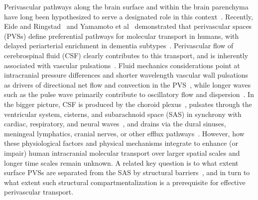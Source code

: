 \documentclass[fleqn,10pt]{wlscirep}
\begin{document}
Perivascular pathways along the brain surface and within the brain
parenchyma have long been hypothesized to serve a designated role in
this context~\cite{rennels1985evidence, zhang1990interrelationships,
  ichimura1991distribution, carare2008solutes, iliff2012paravascular,
  foley2012realtime, hannocks2018molecular, van2024caa}. Recently, Eide and
Ringstad~\cite{eide2024functional} and Yamamoto et
al~\cite{yamamoto2024perivascular} demonstrated that perivascular
spaces (PVSs) define preferential pathways for molecular transport in
humans, with delayed periarterial enrichment in dementia
subtypes~\cite{eide2024functional}. Perivascular flow of cerebrospinal
fluid (CSF) clearly contributes to this transport, and is inherently
associated with vascular pulsations~\cite{hadaczek2006perivascular,
  iliff2013cerebral, bedussi2018paravascular, mestre2018flow,
  boster2023artificial, hirschler2024region}. Fluid mechanics
considerations point at intracranial pressure differences and shorter
wavelength vascular wall pulsations as drivers of directional net flow
and convection in the PVS~\cite{bilston2003arterial, rey2018pulsatile,
  daversin2020mechanisms, kedarasetti2020functional,
  gjerde2023directional, nozaleda2024arterial}, while longer waves
such as the pulse wave primarily contribute to oscillatory flow and
dispersion~\cite{asgari2016glymphatic, sharp2019dispersion,
  kedarasetti2020arterial, troyetsky2021dispersion,
  martinac2021phase}. In the bigger picture, CSF is produced by the
choroid plexus~\cite{damkier2013cerebrospinal,
  steffensen2018cotransporter, liu2020direct}, pulsates through the
ventricular system, cisterns, and subarachnoid space (SAS) in
synchrony with cardiac, respiratory, and neural
waves~\cite{greitz1993pulsatile, wagshul2011pulsating,
  sweetman2011cerebrospinal, fultz2019coupled, vinje2019respiratory,
  eide2021direction, causemann2022human, williams2023neural,
  zimmermann2023total}, and drains via the dural sinuses, meningeal
lymphatics, cranial nerves, or other efflux
pathways~\cite{proulx2021cerebrospinal}. However, how these
physiological factors and physical mechanisms integrate to enhance (or
impair) human intracranial molecular transport over larger spatial
scales and longer time scales remain unknown. A related key question
is to what extent surface PVSs are separated from the SAS by
structural barriers~\cite{zhang1990interrelationships,
  weller2005microscopic, bedussi2017paravascular,
  pizzo2018intrathecal, mestre2022periarteriolar,
  mollgard2023mesothelium, smets2024perivascular, eide2024functional},
and in turn to what extent such structural compartmentalization is a
prerequisite for effective perivascular transport.
 
\end{document}
